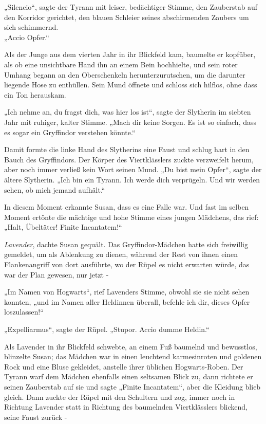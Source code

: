 {„Silencio“, sagte der Tyrann mit leiser, bedächtiger Stimme, den Zauberstab auf den Korridor gerichtet, den blauen Schleier seines abschirmenden Zaubers um sich schimmernd.\\ „Accio Opfer.“

Als der Junge aus dem vierten Jahr in ihr Blickfeld kam, baumelte er kopfüber, als ob eine unsichtbare Hand ihn an einem Bein hochhielte, und sein roter Umhang begann an den Oberschenkeln herunterzurutschen, um die darunter liegende Hose zu enthüllen. Sein Mund öffnete und schloss sich hilflos, ohne dass ein Ton herauskam.

„Ich nehme an, du fragst dich, was hier los ist“, sagte der Slytherin im siebten Jahr mit ruhiger, kalter Stimme. „Mach dir keine Sorgen. Es ist so einfach, dass es sogar ein Gryffindor verstehen könnte.“

Damit formte die linke Hand des Slytherins eine Faust und schlug hart in den Bauch des Gryffindors. Der Körper des Viertklässlers zuckte verzweifelt herum, aber noch immer verließ kein Wort seinen Mund. „Du bist mein Opfer“, sagte der ältere Slytherin. „Ich bin ein Tyrann. Ich werde dich verprügeln. Und wir werden sehen, ob mich jemand aufhält.“

In diesem Moment erkannte Susan, dass es eine Falle war. Und fast im selben Moment ertönte die mächtige und hohe Stimme eines jungen Mädchens, das rief: „Halt, Übeltäter! Finite Incantatem!“

\emph{Lavender}, dachte Susan gequält. Das Gryffindor-Mädchen hatte sich freiwillig gemeldet, um als Ablenkung zu dienen, während der Rest von ihnen einen Flankenangriff von dort ausführte, wo der Rüpel es nicht erwarten würde, das war der Plan gewesen, nur jetzt -

„Im Namen von Hogwarts“, rief Lavenders Stimme, obwohl sie sie nicht sehen konnten, „und im Namen aller Heldinnen überall, befehle ich dir, dieses Opfer loszulassen!“

„Expelliarmus“, sagte der Rüpel. „Stupor. Accio dumme Heldin.“

Als Lavender in ihr Blickfeld schwebte, an einem Fuß baumelnd und bewusstlos, blinzelte Susan; das Mädchen war in einen leuchtend karmesinroten und goldenen Rock und eine Bluse gekleidet, anstelle ihrer üblichen Hogwarts-Roben. Der Tyrann warf dem Mädchen ebenfalls einen seltsamen Blick zu, dann richtete er seinen Zauberstab auf sie und sagte „Finite Incantatem“, aber die Kleidung blieb gleich. Dann zuckte der Rüpel mit den Schultern und zog, immer noch in Richtung Lavender statt in Richtung des baumelnden Viertklässlers blickend, seine Faust zurück -

}
